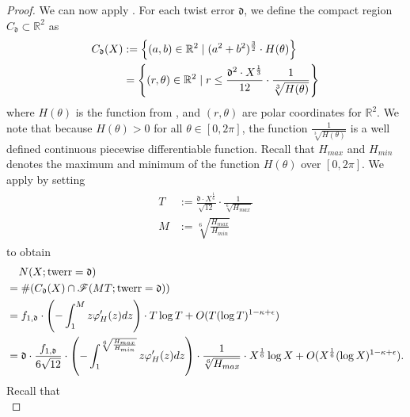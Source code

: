 \documentclass[12pt]{amsart}
\numberwithin{equation}{section} %
\theoremstyle{definition} \newtheorem{definition}[counter]{Definition}
\theoremstyle{remark} \newtheorem{nonexam}[counter]{Non-example}
\newcommand{\FF}{\mathscr{F}} %
\let\originalleft\left \let\originalright\right
\renewcommand{\left}{\mathopen{}\mathclose\bgroup\originalleft}
\renewcommand{\right}{\aftergroup\egroup\originalright}
\DeclareMathOperator{\twerr}{twerr} %
\begin{document}
\begin{proof}
    We can now apply . For each twist error $\mathfrak{d}$, we define the compact region $C_\mathfrak{d} \subset \mathbb{R}^2$ as
    \begin{align}
        \begin{split}
            C_\mathfrak{d}(X) &:= \left\{ (a,b) \in \mathbb{R}^2 \; | \; (a^2+b^2)^{\frac{3}{2}} \cdot H(\theta) \right\} \\
            &= \left\{ (r,\theta) \in \mathbb{R}^2 \; | \; r \leq \frac{\mathfrak{d}^2 \cdot X^{\frac{1}{3}}}{12} \cdot \frac{1}{\sqrt[3]{H(\theta)}}\right\}
        \end{split}
    \end{align}
    where $H(\theta)$ is the function from , and $(r,\theta)$ are polar coordinates for $\mathbb{R}^2$. We note that because $H(\theta) > 0$ for all $\theta \in [0,2\pi]$, the function $\frac{1}{\sqrt[3]{H(\theta)}}$ is a well defined continuous piecewise differentiable function. Recall that $H_{max}$ and $H_{min}$ denotes the maximum and minimum of the function $H(\theta)$ over $[0,2\pi]$. We apply  by setting
    \begin{align}
        \begin{split}
            T &:= \frac{\mathfrak{d} \cdot X^{\frac{1}{6}}}{\sqrt{12}} \cdot \frac{1}{\sqrt[6]{H_{max}}} \\
            M &:= \sqrt[6]{\frac{H_{max}}{H_{min}}}
        \end{split}
    \end{align}
    to obtain
    \begin{align}
        \begin{split}
            & \; \; \; \; N(X; \twerr = \mathfrak{d}) \\
            &= \# \left( C_\mathfrak{d}(X) \cap \FF(MT; \twerr = \mathfrak{d}) \right) \\
            &= f_{1,\mathfrak{d}} \cdot \left(- \int_1^{M} z \varphi'_H(z) dz \right) \cdot T \log T + O(T(\log T)^{1 - \kappa + \epsilon}) \\
            &= \mathfrak{d} \cdot \frac{f_{1,\mathfrak{d}}}{6\sqrt{12}} \cdot \left(- \int_1^{\sqrt[6]{\frac{H_{max}}{H_{min}}}} z \varphi'_H(z) dz \right) \cdot \frac{1}{\sqrt[6]{H_{max}}} \cdot X^{\frac{1}{6}} \log X + O(X^{\frac{1}{6}} (\log X)^{1 - \kappa + \epsilon}).
        \end{split}
    \end{align}
    Recall that 
    \begin{equation*}

\end{equation*}
\end{proof}
\end{document}

